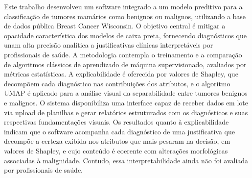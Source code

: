 \documentclass[
    12pt
    ,oneside
    ,a4paper
    ,chapter=TITLE
    ,section=TITLE
    ,sumario=abnt-6027-2012
    ,english,brazil]{abntex2} %
\begin{document}

\imprimircapa
\imprimirfolhaderosto

\begin{resumo}
    Este trabalho desenvolveu um software integrado a um modelo preditivo para a classificação de tumores mamários como benignos ou malignos, utilizando a base de dados pública Breast Cancer Wisconsin. 
    O objetivo central é mitigar a opacidade característica dos modelos de caixa preta, fornecendo diagnósticos que unam alta precisão analítica a justificativas clínicas interpretáveis por profissionais de saúde. 
    A metodologia contempla o treinamento e a comparação de algoritmos clássicos de aprendizado de máquina supervisionado, avaliados por métricas estatísticas. 
    A explicabilidade é oferecida por valores de Shapley, que decompõem cada diagnóstico nas contribuições dos atributos, e o algoritmo UMAP é aplicado para a análise visual da separabilidade entre tumores benignos e malignos.
    O sistema disponibiliza uma interface capaz de receber dados em lote via upload de planilhas e gerar relatórios estruturados com os diagnósticos e suas respectivas fundamentações visuais. 
    Os resultados quanto à explicabilidade indicam que o software acompanha cada diagnóstico de uma justificativa que decompõe a certeza exibida nos atributos que mais pesaram na decisão, em valores de Shapley, e cujo conteúdo é coerente com alterações morfológicas associadas à malignidade. Contudo, essa interpretabilidade ainda não foi avaliada por profissionais de saúde.

\end{resumo}
\end{document}
